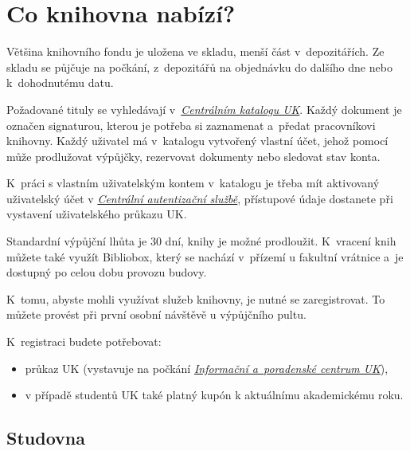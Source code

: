 \section{Co knihovna nabízí?}


{}

Většina knihovního fondu je uložena ve skladu, menší část
v~depozitářích. Ze skladu se půjčuje na počkání, z~depozitářů na
objednávku do dalšího dne nebo k~dohodnutému datu.


Požadované tituly se vyhledávají v~\href{http://ckis.cuni.cz/}{\emph{Centrálním katalogu UK}}. Každý
dokument je označen signaturou, kterou je potřeba si zaznamenat a~předat
pracovníkovi knihovny. Každý uživatel má v~katalogu vytvořený vlastní
účet, jehož pomocí může prodlužovat výpůjčky, rezervovat dokumenty nebo
sledovat stav konta.

K~práci s vlastním uživatelským kontem v~katalogu je třeba mít
aktivovaný uživatelský účet v
\href{https://ldap1.cuni.cz/}{\emph{Centrální autentizační službě}},
přístupové údaje dostanete při vystavení uživatelského průkazu UK.


Standardní výpůjční lhůta je 30 dní, knihy je možné prodloužit.
K~vracení knih můžete také využít Bibliobox, který se nachází v~přízemí
u fakultní vrátnice a~je dostupný po celou dobu provozu
budovy.


K~tomu, abyste mohli využívat služeb knihovny, je nutné se
zaregistrovat. To můžete provést při první osobní návštěvě u výpůjčního pultu.

K~registraci budete potřebovat:

\begin{itemize}
\item
  průkaz UK (vystavuje na počkání
  \href{http://www.cuni.cz/UK-3249.html}{\emph{Informační a~poradenské centrum UK}}),
\item
  v případě studentů UK také platný kupón k aktuálnímu akademickému
  roku.
\end{itemize}

\newpage
\subsection{Studovna}


